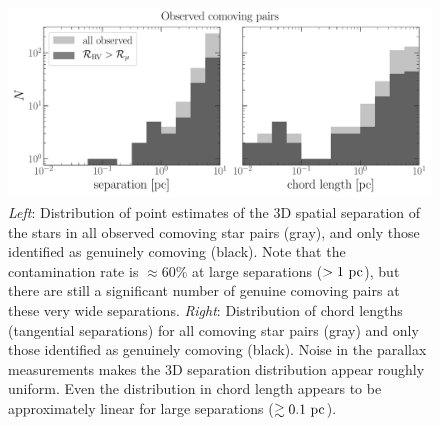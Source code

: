 \documentclass[modern, letterpaper]{aastex61}
\begin{document}
\begin{figure}[htbp]
  \begin{center}
    \includegraphics[width=\linewidth]{separation-hist.pdf}
  \end{center}
  \caption{%
    \emph{Left}: Distribution of point estimates of the 3D spatial separation of
    the stars in all observed comoving star pairs (gray), and only those
    identified as genuinely comoving (black). Note that the contamination rate
    is $\approx 60\%$ at large separations ($>1~\mathrm{pc}$), but there are still a
    significant number of genuine comoving pairs at these very wide separations.
    \emph{Right}: Distribution of chord lengths (tangential separations) for all
    comoving star pairs (gray) and only those identified as genuinely comoving
    (black).
    Noise in the parallax measurements makes the 3D separation distribution
    appear roughly uniform.
    Even the distribution in chord length appears to be approximately linear for
    large separations ($\gtrsim 0.1~\mathrm{pc}$).
    \label{fig:separation}}
\end{figure}
\end{document}
